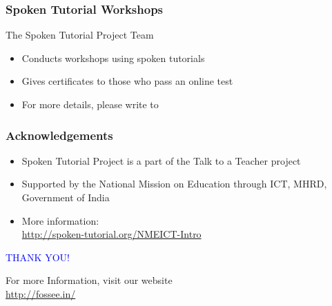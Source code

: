 \documentclass[17pt]{beamer}
\begin{document}
\begin{frame}
\frametitle{Spoken Tutorial Workshops}The Spoken Tutorial Project Team 
\begin{itemize}
\item Conducts workshops using spoken tutorials 
\item Gives certificates to those who pass an online test 
\item For more details, please write to \\ 
\end{itemize}
\end{frame}
\begin{frame}
\frametitle{Acknowledgements}
\begin{itemize}
\item Spoken Tutorial Project is a part of the Talk to a Teacher  project 
\item Supported by the National Mission on Education through  ICT, MHRD, Government of India 
\item More information: \\{\color{blue}\url{http://spoken-tutorial.org/NMEICT-Intro}}
\end{itemize}
\end{frame}
\begin{frame}

  \begin{block}{}
  \begin{center}
  \textcolor{blue}{\Large THANK YOU!} 
  \end{center}
  \end{block}
\begin{block}{}
  \begin{center}
    For more Information, visit our website\\
    {\color{blue}\url{http://fossee.in/}}
  \end{center}  
  \end{block}
\end{frame}
\end{document}
